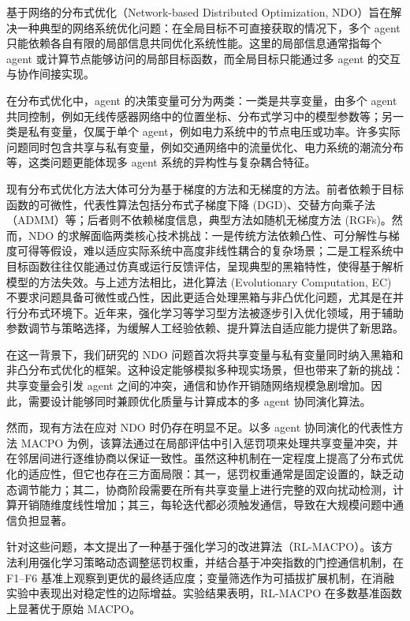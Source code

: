 \documentclass[12pt]{ctexart}
\begin{document}
基于网络的分布式优化（Network-based Distributed Optimization,
NDO）旨在解决一种典型的网络系统优化问题：在全局目标不可直接获取的情况下，多个
agent
只能依赖各自有限的局部信息共同优化系统性能。这里的局部信息通常指每个
agent 或计算节点能够访问的局部目标函数，而全局目标只能通过多 agent
的交互与协作间接实现。

在分布式优化中，agent 的决策变量可分为两类：一类是共享变量，由多个 agent
共同控制，例如无线传感器网络中的位置坐标、分布式学习中的模型参数等；另一类是私有变量，仅属于单个
agent，例如电力系统中的节点电压或功率。许多实际问题同时包含共享与私有变量，例如交通网络中的流量优化、电力系统的潮流分布等，这类问题更能体现多
agent 系统的异构性与复杂耦合特征。

现有分布式优化方法大体可分为基于梯度的方法和无梯度的方法。前者依赖于目标函数的可微性，代表性算法包括分布式子梯度下降
(DGD)、交替方向乘子法（ADMM）等；后者则不依赖梯度信息，典型方法如随机无梯度方法
(RGFs)。然而，NDO 的求解面临两类核心技术挑战：一是传统方法依赖凸性、可分解性与梯度可得等假设，难以适应实际系统中高度非线性耦合的复杂场景；二是工程系统中目标函数往往仅能通过仿真或运行反馈评估，呈现典型的黑箱特性，使得基于解析模型的方法失效。与上述方法相比，进化算法 (Evolutionary Computation, EC)
不要求问题具备可微性或凸性，因此更适合处理黑箱与非凸优化问题，尤其是在并行分布式环境下。近年来，强化学习等学习型方法被逐步引入优化领域，用于辅助参数调节与策略选择，为缓解人工经验依赖、提升算法自适应能力提供了新思路。

在这一背景下，我们研究的 NDO
问题首次将共享变量与私有变量同时纳入黑箱和非凸分布式优化的框架。这种设定能够模拟多种现实场景，但也带来了新的挑战：共享变量会引发
agent
之间的冲突，通信和协作开销随网络规模急剧增加。因此，需要设计能够同时兼顾优化质量与计算成本的多
agent 协同演化算法。

然而，现有方法在应对 NDO 时仍存在明显不足。以多 agent
协同演化的代表性方法 MACPO
为例，该算法通过在局部评估中引入惩罚项来处理共享变量冲突，并在邻居间进行逐维协商以保证一致性。虽然这种机制在一定程度上提高了分布式优化的适应性，但它也存在三方面局限：其一，惩罚权重通常是固定设置的，缺乏动态调节能力；其二，协商阶段需要在所有共享变量上进行完整的双向扰动检测，计算开销随维度线性增加；其三，每轮迭代都必须触发通信，导致在大规模问题中通信负担显著。

针对这些问题，本文提出了一种基于强化学习的改进算法（RL-MACPO）。该方法利用强化学习策略动态调整惩罚权重，并结合基于冲突指数的门控通信机制，在 F1--F6 基准上观察到更优的最终适应度；变量筛选作为可插拔扩展机制，在消融实验中表现出对稳定性的边际增益。实验结果表明，RL-MACPO 在多数基准函数上显著优于原始 MACPO。
\end{document}
